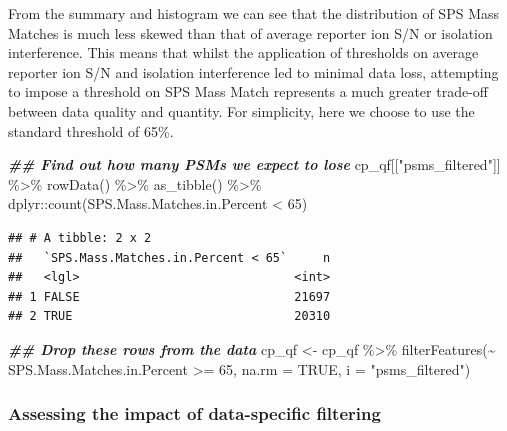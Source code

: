 \documentclass[9pt,a4paper,]{extarticle}
\newenvironment{Shaded}{\begin{snugshade}}{\end{snugshade}}
\newcommand{\AttributeTok}[1]{\textcolor[rgb]{0.77,0.63,0.00}{#1}}
\newcommand{\ConstantTok}[1]{\textcolor[rgb]{0.00,0.00,0.00}{#1}}
\newcommand{\DecValTok}[1]{\textcolor[rgb]{0.00,0.00,0.81}{#1}}
\newcommand{\DocumentationTok}[1]{\textcolor[rgb]{0.56,0.35,0.01}{\textbf{\textit{#1}}}}
\newcommand{\FunctionTok}[1]{\textcolor[rgb]{0.00,0.00,0.00}{#1}}
\newcommand{\NormalTok}[1]{#1}
\newcommand{\OtherTok}[1]{\textcolor[rgb]{0.56,0.35,0.01}{#1}}
\newcommand{\SpecialCharTok}[1]{\textcolor[rgb]{0.00,0.00,0.00}{#1}}
\newcommand{\StringTok}[1]{\textcolor[rgb]{0.31,0.60,0.02}{#1}}
\begin{document}
From the summary and histogram we can see that the distribution of SPS Mass
Matches is much less skewed than that of average reporter ion S/N or isolation
interference. This means that whilst the application of thresholds on average
reporter ion S/N and isolation interference led to minimal data loss, attempting
to impose a threshold on SPS Mass Match represents a much greater trade-off
between data quality and quantity. For simplicity, here we choose to use the
standard threshold of 65\%.

\begin{Shaded}
\begin{Highlighting}[]
\DocumentationTok{\#\# Find out how many PSMs we expect to lose}
\NormalTok{cp\_qf[[}\StringTok{"psms\_filtered"}\NormalTok{]] }\SpecialCharTok{\%\textgreater{}\%} 
  \FunctionTok{rowData}\NormalTok{() }\SpecialCharTok{\%\textgreater{}\%} 
  \FunctionTok{as\_tibble}\NormalTok{() }\SpecialCharTok{\%\textgreater{}\%} 
\NormalTok{  dplyr}\SpecialCharTok{::}\FunctionTok{count}\NormalTok{(SPS.Mass.Matches.in.Percent }\SpecialCharTok{\textless{}} \DecValTok{65}\NormalTok{)}
\end{Highlighting}
\end{Shaded}

\begin{verbatim}
## # A tibble: 2 x 2
##   `SPS.Mass.Matches.in.Percent < 65`     n
##   <lgl>                              <int>
## 1 FALSE                              21697
## 2 TRUE                               20310
\end{verbatim}

\begin{Shaded}
\begin{Highlighting}[]
\DocumentationTok{\#\# Drop these rows from the data}
\NormalTok{cp\_qf }\OtherTok{\textless{}{-}}\NormalTok{ cp\_qf }\SpecialCharTok{\%\textgreater{}\%}
  \FunctionTok{filterFeatures}\NormalTok{(}\SpecialCharTok{\textasciitilde{}}\NormalTok{ SPS.Mass.Matches.in.Percent }\SpecialCharTok{\textgreater{}=} \DecValTok{65}\NormalTok{, }
                 \AttributeTok{na.rm =} \ConstantTok{TRUE}\NormalTok{,}
                 \AttributeTok{i =} \StringTok{"psms\_filtered"}\NormalTok{)}
\end{Highlighting}
\end{Shaded}

\hypertarget{assessing-the-impact-of-data-specific-filtering}{%
\subsubsection{Assessing the impact of data-specific filtering}\label{assessing-the-impact-of-data-specific-filtering}}
\end{document}
